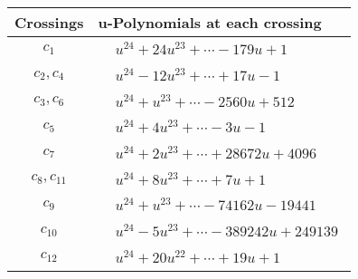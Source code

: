 \documentclass[1p]{elsarticle_modified}
\theoremstyle{definition}
\begin{document}
\begin{tabular}{m{50pt}|m{274pt}}
Crossings & \hspace{64pt}u-Polynomials at each crossing \\
\hline $$\begin{aligned}c_{1}\end{aligned}$$&$\begin{aligned}
&u^{24}+24 u^{23}+\cdots-179 u+1
\end{aligned}$\\
\hline $$\begin{aligned}c_{2},c_{4}\end{aligned}$$&$\begin{aligned}
&u^{24}-12 u^{23}+\cdots+17 u-1
\end{aligned}$\\
\hline $$\begin{aligned}c_{3},c_{6}\end{aligned}$$&$\begin{aligned}
&u^{24}+u^{23}+\cdots-2560 u+512
\end{aligned}$\\
\hline $$\begin{aligned}c_{5}\end{aligned}$$&$\begin{aligned}
&u^{24}+4 u^{23}+\cdots-3 u-1
\end{aligned}$\\
\hline $$\begin{aligned}c_{7}\end{aligned}$$&$\begin{aligned}
&u^{24}+2 u^{23}+\cdots+28672 u+4096
\end{aligned}$\\
\hline $$\begin{aligned}c_{8},c_{11}\end{aligned}$$&$\begin{aligned}
&u^{24}+8 u^{23}+\cdots+7 u+1
\end{aligned}$\\
\hline $$\begin{aligned}c_{9}\end{aligned}$$&$\begin{aligned}
&u^{24}+u^{23}+\cdots-74162 u-19441
\end{aligned}$\\
\hline $$\begin{aligned}c_{10}\end{aligned}$$&$\begin{aligned}
&u^{24}-5 u^{23}+\cdots-389242 u+249139
\end{aligned}$\\
\hline $$\begin{aligned}c_{12}\end{aligned}$$&$\begin{aligned}
&u^{24}+20 u^{22}+\cdots+19 u+1
\end{aligned}$\\
\hline
\end{tabular}\\~\\
\end{document}
